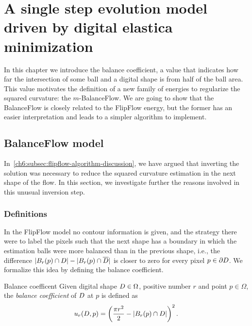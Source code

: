 \chapter{A single step evolution model driven by digital elastica minimization}
\label{chapter:balance-flow}


In this chapter we introduce the balance coefficient, a value that indicates how far the intersection of some ball and a digital shape is from half of the ball area. This value motivates the definition of a new family of energies to regularize the squared curvature: the $m$-BalanceFlow. We are going to show that the BalanceFlow is closely related to the FlipFlow energy, but the former has an easier interpretation and leads to a simpler algorithm to implement.


\section{BalanceFlow model}
In~\cref{ch6:subsec:flipflow-algorithm-discussion}, we have argued that inverting the solution was necessary to reduce the squared curvature estimation in the next shape of the flow. In this section, we investigate further the reasons involved in this unusual inversion step. 

\subsection{Definitions}

In the FlipFlow model no contour information is given, and the strategy there were to label the pixels such that the next shape has a boundary in which the estimation balls were more balanced than in the previous shape, i.e., the difference $|B_r(p) \cap D| - |B_r(p) \cap \overline{D}|$ is closer to zero for every pixel $p \in \partial D$.  We formalize this idea by defining the balance coefficient.

\begin{definition}{Balance coefficent}
Given digital shape $D \in \Omega$, positive number $r$ and point $p \in \Omega$, the \emph{balance coefficient} of $D$ at $p$ is defined as
\begin{align*}
	u_r(D,p) = \left( \frac{\pi r^2}{2} - |B_r(p) \cap D| \right)^2.
\end{align*}
%
\end{definition}


